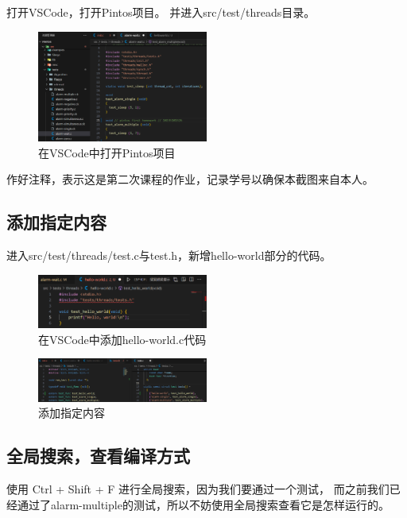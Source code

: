打开VSCode，打开Pintos项目。
并进入src/test/threads目录。
\begin{figure}[H]
  \centering
  \includegraphics[width=0.5\textwidth]{img2/1.png}
  \caption{在VSCode中打开Pintos项目}
\end{figure}

作好注释，表示这是第二次课程的作业，记录学号以确保本截图来自本人。

\subsection{添加指定内容}

进入src/test/threads/test.c与test.h，新增hello-world部分的代码。

\begin{figure}[H]
  \centering
  \includegraphics[width=0.5\textwidth]{img2/helloworld.png}
  \caption{在VSCode中添加hello-world.c代码}
\end{figure}

\begin{figure} [H]
  \centering
  \includegraphics[width=0.5\textwidth]{img2/2.png}
  \caption{添加指定内容}
\end{figure}

\subsection{全局搜索，查看编译方式}

使用 Ctrl + Shift + F 进行全局搜索，因为我们要通过一个测试，
而之前我们已经通过了alarm-multiple的测试，所以不妨使用全局搜索查看它是怎样运行的。

